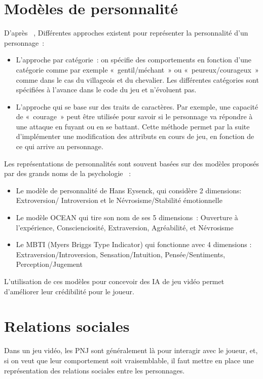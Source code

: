\documentclass[asi]{picINSA}
\begin{document}
\section{Modèles de personnalité}
D'après ~\cite{ochs2009simulation}, Différentes approches existent pour représenter la personnalité d'un personnage :
\begin{itemize}
\item L'approche par catégorie : on spécifie des comportements en fonction d'une catégorie comme par exemple « gentil/méchant » ou « peureux/courageux » comme dans le cas du villageois et du chevalier. Les différentes catégories sont spécifiées à l'avance dans le code du jeu et n'évoluent pas.
\item L'approche qui se base sur des traits de caractères. Par exemple, une capacité de « courage » peut être utilisée pour savoir si le personnage va répondre à une attaque en fuyant ou en se battant. Cette méthode permet par la suite d'implémenter une modification des attributs en cours de jeu, en fonction de ce qui arrive au personnage.  
\end{itemize}
Les représentations de personnalités sont souvent basées sur des modèles proposés par des grands noms de la psychologie  :
\begin{itemize}
\item Le modèle de personnalité de Hans Eysenck, qui considère 2 dimensions: Extroversion/ Introversion et  le Névrosisme/Stabilité émotionnelle
\item Le modèle OCEAN qui tire son nom de ses 5 dimensions : Ouverture à l'expérience, Conscienciosité, Extraversion, Agréabilité, et Névrosisme
\item Le MBTI (Myers Briggs Type Indicator) qui fonctionne avec 4 dimensions : Extraversion/Introversion, Sensation/Intuition, Pensée/Sentiments, Perception/Jugement
\end{itemize}
L'utilisation de ces modèles pour concevoir des IA de jeu vidéo permet d'améliorer leur crédibilité pour le joueur.

\section{Relations sociales}
Dans un jeu vidéo, les PNJ sont généralement là pour interagir avec le joueur, et, si on veut que leur comportement soit vraisemblable, il faut mettre en place une représentation des relations sociales entre les personnages. \\
\end{document}

